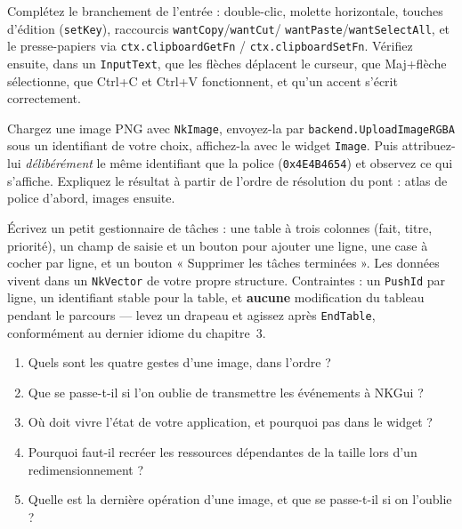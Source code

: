 \begin{nkpratique}
Complétez le branchement de l'entrée : double-clic, molette horizontale, touches
d'édition (\texttt{setKey}), raccourcis \texttt{wantCopy}/\texttt{wantCut}/%
\texttt{wantPaste}/\texttt{wantSelectAll}, et le presse-papiers via
\texttt{ctx.clipboardGetFn} / \texttt{ctx.clipboardSetFn}. Vérifiez ensuite,
dans un \texttt{InputText}, que les flèches déplacent le curseur, que Maj+flèche
sélectionne, que Ctrl+C et Ctrl+V fonctionnent, et qu'un accent s'écrit
correctement.
\end{nkpratique}

\begin{nkpratique}
Chargez une image PNG avec \texttt{NkImage}, envoyez-la par
\texttt{backend.UploadImageRGBA} sous un identifiant de votre choix, affichez-la
avec le widget \texttt{Image}. Puis attribuez-lui \emph{délibérément} le même
identifiant que la police (\texttt{0x4E4B4654}) et observez ce qui s'affiche.
Expliquez le résultat à partir de l'ordre de résolution du pont : atlas de
police d'abord, images ensuite.
\end{nkpratique}

\begin{nkpratique}
Écrivez un petit gestionnaire de tâches : une table à trois colonnes (fait,
titre, priorité), un champ de saisie et un bouton pour ajouter une ligne, une
case à cocher par ligne, et un bouton « Supprimer les tâches terminées ». Les
données vivent dans un \texttt{NkVector} de votre propre structure. Contraintes :
un \texttt{PushId} par ligne, un identifiant stable pour la table, et
\textbf{aucune} modification du tableau pendant le parcours — levez un drapeau
et agissez après \texttt{EndTable}, conformément au dernier idiome du
chapitre~3.
\end{nkpratique}

\begin{nkquestions}
\begin{enumerate}
\item Quels sont les quatre gestes d'une image, dans l'ordre ?
\item Que se passe-t-il si l'on oublie de transmettre les événements à NKGui ?
\item Où doit vivre l'état de votre application, et pourquoi pas dans le widget ?
\item Pourquoi faut-il recréer les ressources dépendantes de la taille lors d'un
      redimensionnement ?
\item Quelle est la dernière opération d'une image, et que se passe-t-il si on
      l'oublie ?
\end{enumerate}
\end{nkquestions}

